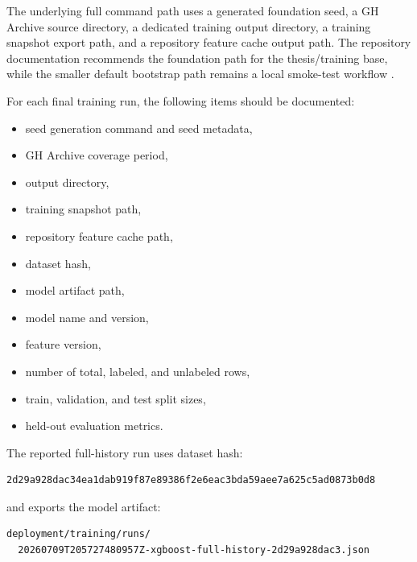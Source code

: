 The underlying full command path uses a generated foundation seed, a GH Archive source directory, a dedicated training output directory, a training snapshot export path, and a repository feature cache output path. The repository documentation recommends the foundation path for the thesis/training base, while the smaller default bootstrap path remains a local smoke-test workflow \cite{ossRiskRadarDatasetBuilder}.

For each final training run, the following items should be documented:

\begin{itemize}
    \item seed generation command and seed metadata,
    \item GH Archive coverage period,
    \item output directory,
    \item training snapshot path,
    \item repository feature cache path,
    \item dataset hash,
    \item model artifact path,
    \item model name and version,
    \item feature version,
    \item number of total, labeled, and unlabeled rows,
    \item train, validation, and test split sizes,
    \item held-out evaluation metrics.
\end{itemize}

The reported full-history run uses dataset hash:

\begin{verbatim}
2d29a928dac34ea1dab919f87e89386f2e6eac3bda59aee7a625c5ad0873b0d8
\end{verbatim}

and exports the model artifact:

\begin{verbatim}
deployment/training/runs/
  20260709T205727480957Z-xgboost-full-history-2d29a928dac3.json
\end{verbatim}

